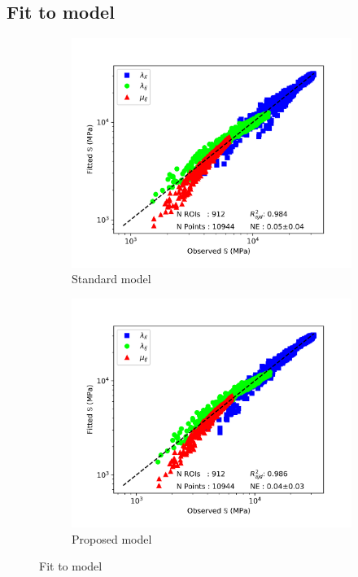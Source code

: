 \documentclass[a4paper,fleqn]{DC_ArtStyle}
\begin{document}
	\subsection{Fit to model}
	\begin{figure}
		\centering
		\begin{subfigure}[b]{0.45\linewidth}
			\includegraphics[width=\linewidth]{../_Results/StandardModel}
			\caption{Standard model}
		\end{subfigure}
		\begin{subfigure}[b]{0.45\linewidth}
			\includegraphics[width=\linewidth]{../_Results/ProposedModel}
			\caption{Proposed model}
		\end{subfigure}
		\caption{Fit to model}
	\end{figure}
\end{document}
